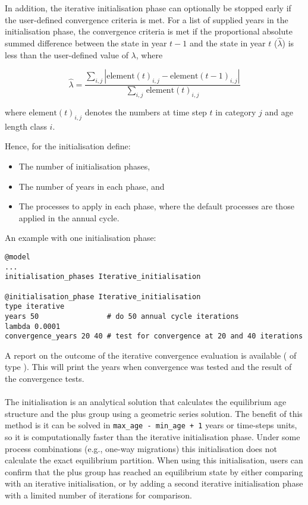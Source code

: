 In addition, the iterative initialisation phase can optionally be stopped early if the user-defined convergence criteria is met. For a list of supplied years in the initialisation phase, the convergence criteria is met if the proportional absolute summed difference between the state in year $t-1$ and the state in year $t$ ($\widehat{\lambda}$) is less than the user-defined value of $\lambda$, where

\begin{equation}
  \widehat{\lambda} = \frac{\sum\limits_{i,j}  \left|\text{element}(t)_{i,j} - \text{element}(t-1)_{i,j} \right|}{\sum\limits_{i,j} \frac{}{}\text{element}(t)_{i,j}}
\end{equation}

where $\text{element}(t)_{i,j}$ denotes the numbers at time step $t$ in category $j$ and \ifAgeBased age \else length class \fi $i$.

Hence, for the initialisation define:

\begin{itemize}
  \item The number of initialisation phases,
  \item The number of years in each phase, and
  \item The processes to apply in each phase, where the default processes are those applied in the annual cycle.
\end{itemize}

An example with one initialisation phase:

{\small{\begin{verbatim}
@model
...
initialisation_phases Iterative_initialisation

@initialisation_phase Iterative_initialisation
type iterative
years 50                # do 50 annual cycle iterations
lambda 0.0001
convergence_years 20 40 # test for convergence at 20 and 40 iterations
\end{verbatim}}}

A report on the outcome of the iterative convergence evaluation is available ( of type ). This will print the years when convergence was tested and the result of the convergence tests.

\ifAgeBased
\paragraph{}\label{sec:InitialisationPhase-Derived}

The  initialisation is an analytical solution that calculates the equilibrium age structure and the plus group using a geometric series solution. The benefit of this method is it can be solved in \texttt{max\_age - min\_age + 1} years or time-steps units, so it is computationally faster than the iterative initialisation phase. Under some process combinations (e.g., one-way migrations) this initialisation does not calculate the exact equilibrium partition. When using this initialisation, users can confirm that the plus group has reached an equilibrium state by either comparing with an iterative initialisation, or by adding a second iterative initialisation phase with a limited number of iterations for comparison.

